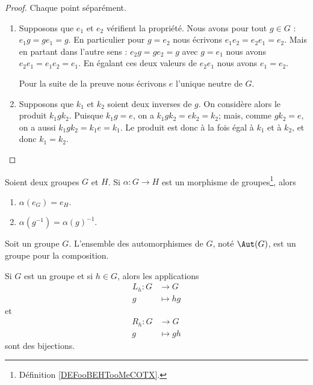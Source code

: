 \begin{proof}
	Chaque point séparément.
	\begin{enumerate}
		\item
		      Supposons que \( e_1\) et \( e_2\) vérifient la propriété. Nous avons pour tout \( g\in G\) : \( e_1g=ge_1=g\). En particulier pour \( g=e_2\) nous écrivons \( e_1e_2=e_2e_1=e_2\). Mais en partant dans l'autre sens : \( e_2g=ge_2=g\) avec \( g=e_1\) nous avons \( e_2e_1=e_1e_2=e_1\). En égalant ces deux valeurs de \( e_2e_1\) nous avons \( e_1=e_2\).

		      Pour la suite de la preuve nous écrivons \( e\) l'unique neutre de \( G\).

		\item
		      Supposons que \( k_1\) et \( k_2\) soient deux inverses de \( g\). On considère alors le produit \( k_1 g k_2 \). Puisque \(k_1 g = e \), on a \( k_1 g k_2 = e k_2 = k_2 \); mais, comme \(g k_2 = e \), on a aussi \( k_1 g k_2 = k_1 e = k_1 \). Le produit est donc à la fois égal à \( k_1 \) et à \( k_2 \), et donc \( k_1 = k_2 \).
	\end{enumerate}
\end{proof}

\begin{lemma}       \label{LEMooWYLRooNOdZnp}
	Soient deux groupes \( G\) et \( H\). Si \( \alpha\colon G\to H\) est un morphisme de groupes\footnote{Définition \ref{DEFooBEHTooMeCOTX}.}, alors
	\begin{enumerate}
		\item
		      \( \alpha(e_G)=e_H\).
		\item
		      \( \alpha(g^{-1})=\alpha(g)^{-1}\).
	\end{enumerate}
\end{lemma}

\begin{lemmaDef}        \label{LEMooSQQDooCmOvqi}
	Soit un groupe \( G\). L'ensemble des automorphismes de \( G\), noté \( \Aut(G)\), est un groupe pour la composition.
\end{lemmaDef}


\begin{lemma}       \label{LEMooBIBFooBHxFYC}
	Si \( G\) est un groupe et si \( h\in G\), alors les applications
	\begin{equation}
		\begin{aligned}
			L_h\colon G & \to G      \\
			g           & \mapsto hg
		\end{aligned}
	\end{equation}
	et
	\begin{equation}
		\begin{aligned}
			R_h\colon G & \to G      \\
			g           & \mapsto gh
		\end{aligned}
	\end{equation}
	sont des bijections.
\end{lemma}

